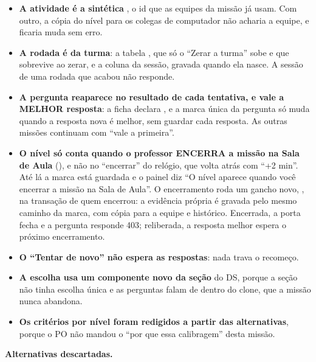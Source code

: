 \begin{itemize}
  \item \textbf{A atividade é a sintética }, o id que as equipes da
    missão já usam. Com outro, a cópia do nível para os colegas de computador
    não acharia a equipe, e ficaria muda sem erro.
  \item \textbf{A rodada é da turma}: a tabela , que
    só o \enquote{Zerar a turma} sobe e que sobrevive ao zerar, e a coluna
     da sessão, gravada quando ela nasce. A sessão de uma rodada que
    acabou não responde.
  \item \textbf{A pergunta reaparece no resultado de cada tentativa, e vale a
    MELHOR resposta}: a ficha declara , e a marca única
    da pergunta só muda quando a resposta nova é melhor, sem guardar cada
    resposta. As outras missões continuam com \enquote{vale a primeira}.
  \item \textbf{O nível só conta quando o professor ENCERRA a missão na Sala de
    Aula} (), e não no \enquote{encerrar} do relógio,
    que volta atrás com \enquote{+2 min}. Até lá a marca está guardada e o
    painel diz \enquote{O nível aparece quando você encerrar a missão na Sala de
    Aula}. O encerramento roda um gancho novo, ,
    na transação de quem encerrou: a evidência própria é gravada pelo mesmo
    caminho da marca, com cópia para a equipe e histórico. Encerrada, a porta
    fecha e a pergunta responde 403; reliberada, a resposta melhor espera o
    próximo encerramento.
  \item \textbf{O \enquote{Tentar de novo} não espera as respostas}: nada trava o
    recomeço.
  \item \textbf{A escolha usa um componente novo da seção } do
    DS, porque a seção não tinha escolha única e as perguntas falam de dentro do
    clone, que a missão nunca abandona.
  \item \textbf{Os critérios por nível foram redigidos a partir das
    alternativas}, porque o PO não mandou o \enquote{por que essa calibragem}
    desta missão.
\end{itemize}

\textbf{Alternativas descartadas.}

